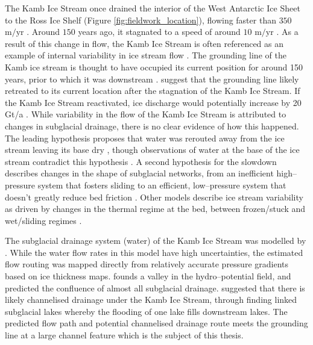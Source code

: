 The  Kamb Ice Stream  once  drained  the  interior  of  the  West  Antarctic  Ice  Sheet  to  the Ross Ice Shelf (Figure \ref{fig:fieldwork_location}), flowing faster than $350$ $\mbox{m/yr}$ \citep{ng2004fast}.  Around $150$ years ago, it stagnated to a speed of around $10$ $\mbox{m/yr}$ \citep{ng2004fast}.   As  a  result  of  this  change  in  flow,  the  Kamb Ice Stream is  often referenced as an example of internal variability in ice stream flow \citep[e.g.][]{hulbe2004west}.  
The grounding line of the Kamb ice stream is thought to have occupied its current position for around 150 years, prior to which it was downstream \citep{fried2014grounding}. \cite{horgan2017poststagnation} suggest that the grounding line likely retreated to its current location after the stagnation of the Kamb Ice Stream.
If the Kamb Ice Stream reactivated, ice discharge would potentially increase by 20 Gt/a \citep{jacobel2009spatial}. 
While variability in the flow of the Kamb Ice Stream is attributed to changes in subglacial drainage, there is no clear evidence of how this happened. The leading hypothesis proposes that water was rerouted  away  from  the  ice  stream  leaving  its  base  dry \citep[e.g.][]{anandakrishnan1997stagnation}, though observations of water at the base of the ice stream contradict this hypothesis \citep{engelhardt1997basal}.  A second hypothesis for the slowdown describes changes in the shape of subglacial networks, from an inefficient high--pressure system that fosters sliding to an efficient, low--pressure system that doesn’t greatly reduce bed friction \citep{lelandais2018modelled,retzlaff1993timing}. Other models describe ice stream variability as driven by changes in the thermal regime at the bed, between frozen/stuck and wet/sliding regimes \cite[e.g.]{robel2013dynamics}.

The subglacial drainage system (water) of the Kamb Ice Stream was modelled by \cite{le2013evidence}. While the water flow rates in this model have high uncertainties, the estimated flow routing was mapped directly from relatively accurate pressure gradients based on ice thickness maps. \cite{le2013evidence} founds a valley in the hydro--potential field, and predicted the confluence of almost all subglacial drainage. \cite{kim2016active} suggested that there is likely channelised drainage under the Kamb Ice Stream, through finding linked subglacial lakes whereby the flooding of one lake fills downstream lakes.  The predicted flow path and potential channelised drainage route meets the grounding line at a large channel feature which is the subject of this thesis. 


